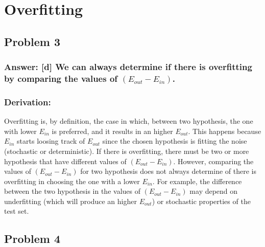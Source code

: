 \documentclass[11pt]{article}
\begin{document}
    \hypertarget{overfitting}{%
\section{Overfitting}\label{overfitting}}

\hypertarget{problem-3}{%
\subsection{Problem 3}\label{problem-3}}

\hypertarget{answer-d-we-can-always-determine-if-there-is-overfitting-by-comparing-the-values-of-e_out-e_in.}{%
\subsubsection{\texorpdfstring{Answer: {[}d{]} We can always determine
if there is overfitting by comparing the values of
\((E_{out}-E_{in})\).}{Answer: {[}d{]} We can always determine if there is overfitting by comparing the values of (E\_\{out\}-E\_\{in\}).}}\label{answer-d-we-can-always-determine-if-there-is-overfitting-by-comparing-the-values-of-e_out-e_in.}}

\hypertarget{derivation}{%
\subsubsection{Derivation:}\label{derivation}}

Overfitting is, by definition, the case in which, between two
hypothesis, the one with lower \(E_{in}\) is preferred, and it results
in an higher \(E_{out}\). This happens because \(E_{in}\) starts loosing
track of \(E_{out}\) since the chosen hypothesis is fitting the noise
(stochastic or deterministic). If there is overfitting, there must be
two or more hypothesis that have different values of
\((E_{out}-E_{in})\). However, comparing the values of
\((E_{out}-E_{in})\) for two hypothesis does not always determine of
there is overfitting in choosing the one with a lower \(E_{in}\). For
example, the difference between the two hypothesis in the values of
\((E_{out}-E_{in})\) may depend on underfitting (which will produce an
higher \(E_{out}\)) or stochastic properties of the test set.

    \hypertarget{problem-4}{%
\subsection{Problem 4}\label{problem-4}}
\end{document}
